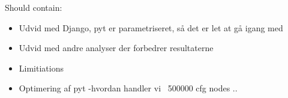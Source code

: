 Should contain:
\begin{itemize}
\item Udvid med Django, pyt er parametriseret, så det er let at gå igang med
\item Udvid med andre analyser der forbedrer resultaterne
\item Limitiations
\item Optimering af pyt -hvordan handler vi ~500000 cfg nodes ..
\end{itemize}
